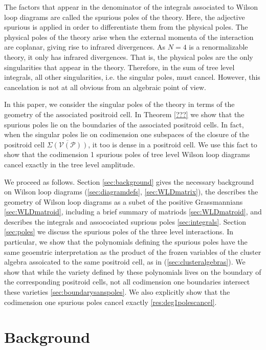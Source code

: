 \documentclass[11pt]{article}
\newcommand{\cP}{\mathcal{P}}
\newcommand{\cV}{\mathcal{V}}
\newcommand{\VP}{\cV(\cP)}
\theoremstyle{remark}
\theoremstyle{definition}
\begin{document}
The factors that appear in the denominator of the integrals associated to Wilson loop diagrams are called the spurious poles of the theory. Here, the adjective spurious is applied in order to differentiate them from the physical poles. The physical poles of the theory arise when the external momenta of the interaction are coplanar, giving rise to infrared divergences. As $N=4$ is a renormalizable theory, it only has infrared divergences. That is, the physical poles are the only singularities that appear in the theory. Therefore, in the sum of tree level integrals, all other singularities, i.e. the singular poles, must cancel. However, this cancelation is not at all obvious from an algebraic point of view. 

In this paper, we consider the singular poles of the theory in terms of the geometry of the associated positroid cell. In Theorem \ref{???} we show that the spurious poles lie on the boundaries of the associated positroid cells. In fact, when the singular poles lie on codimension one subspaces of the closure of the positroid cell $\overline{\Sigma(\VP)}$, it too is dense in a positroid cell. We use this fact to show that the codimension 1 spurious poles of tree level Wilson loop diagrams cancel exactly in the tree level amplitude. 

We proceed as follows. Section \ref{sec:background} gives the necessary background on Wilson loop diagrams (\ref{sec:diagramdefs}, \ref{sec:WLDmatrix}), the describes the geometry of Wilson loop diagrams  as a subet of the positive Grassmannians \eqref{sec:WLDmatroid}, including a brief summary of matriods \eqref{sec:WLDmatroid}, and describes the integrals and assocociated suprious poles \eqref{sec:integrals}. Section \ref{sec:poles} we discuss the spurious poles of the three level interactions. In particular, we show that the polynomials defining the spurious poles have the same geoemtric interpretation as the product of the frozen variables of the cluster algebra assoicated to the same positroid cell, as in \cite{SS-BW, LamGalashin}(\ref{sec:clusteralgebras}). We show that while the variety defined by these polynomials lives on the boundary of the corresponding positroid cells, not all codimension one boundaries intersect these varieties \ref{sec:boundarysanspoles}. We also explicitly show that the codimension one spurious poles cancel exactly \ref{res:deg1polescancel}. 


 

\section{Background \label{sec:background}}
\end{document}
